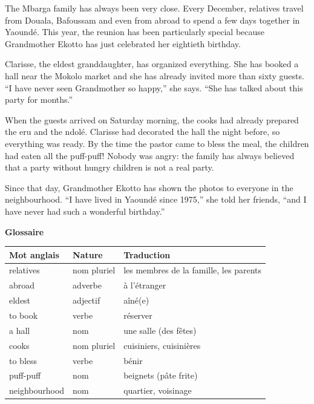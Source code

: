 \documentclass[11pt]{article}
\begin{document}
\begin{textebox}
The Mbarga family has always been very close. Every December, relatives travel from Douala, Bafoussam and even from abroad to spend a few days together in Yaoundé. This year, the reunion has been particularly special because Grandmother Ekotto has just celebrated her eightieth birthday.

Clarisse, the eldest granddaughter, has organized everything. She has booked a hall near the Mokolo market and she has already invited more than sixty guests. “I have never seen Grandmother so happy,” she says. “She has talked about this party for months.”

When the guests arrived on Saturday morning, the cooks had already prepared the eru and the ndolé. Clarisse had decorated the hall the night before, so everything was ready. By the time the pastor came to bless the meal, the children had eaten all the puff-puff! Nobody was angry: the family has always believed that a party without hungry children is not a real party.

Since that day, Grandmother Ekotto has shown the photos to everyone in the neighbourhood. “I have lived in Yaoundé since 1975,” she told her friends, “and I have never had such a wonderful birthday.”
\end{textebox}

\textbf{Glossaire}\par

\begin{center}
\begin{tabularx}{\linewidth}{|l|l|X|}
\hline
\rowcolor{popblueL} \textbf{Mot anglais} & \textbf{Nature} & \textbf{Traduction} \\
\hline
relatives & nom pluriel & les membres de la famille, les parents \\
\hline
abroad & adverbe & à l'étranger \\
\hline
eldest & adjectif & aîné(e) \\
\hline
to book & verbe & réserver \\
\hline
a hall & nom & une salle (des fêtes) \\
\hline
cooks & nom pluriel & cuisiniers, cuisinières \\
\hline
to bless & verbe & bénir \\
\hline
puff-puff & nom & beignets (pâte frite) \\
\hline
neighbourhood & nom & quartier, voisinage \\
\hline
\end{tabularx}
\end{center}
\end{document}
